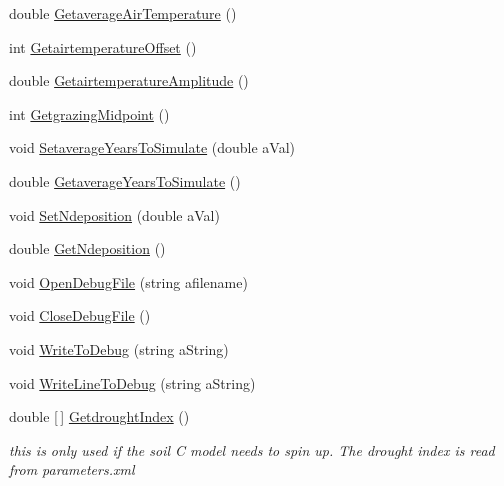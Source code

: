 \begin{DoxyCompactItemize}
\item 
double \mbox{\hyperlink{struct_global_vars_1_1zone_specific_data_a8090a944d3457c9078ef4c143591657a}{Getaverage\+Air\+Temperature}} ()
\item 
int \mbox{\hyperlink{struct_global_vars_1_1zone_specific_data_af1bd37d9f4d31ce45a6b258c17c61ee8}{Getairtemperature\+Offset}} ()
\item 
double \mbox{\hyperlink{struct_global_vars_1_1zone_specific_data_abe8d04141904b2f25c221ff6e61baa85}{Getairtemperature\+Amplitude}} ()
\item 
int \mbox{\hyperlink{struct_global_vars_1_1zone_specific_data_a7e40be9be3646dc302271d6696af70c7}{Getgrazing\+Midpoint}} ()
\item 
void \mbox{\hyperlink{struct_global_vars_1_1zone_specific_data_a9d9c7918bc0060def3f43f5225943c88}{Setaverage\+Years\+To\+Simulate}} (double a\+Val)
\item 
double \mbox{\hyperlink{struct_global_vars_1_1zone_specific_data_a07113789f9a899a461491840759674c4}{Getaverage\+Years\+To\+Simulate}} ()
\item 
void \mbox{\hyperlink{struct_global_vars_1_1zone_specific_data_aadeeac9ab87500a320f305f8e1c41c98}{Set\+Ndeposition}} (double a\+Val)
\item 
double \mbox{\hyperlink{struct_global_vars_1_1zone_specific_data_a90ad22f1144d1dc0f9bbeeacbecfae0d}{Get\+Ndeposition}} ()
\item 
void \mbox{\hyperlink{struct_global_vars_1_1zone_specific_data_a016b9b6888f6421e60fd9097379220e9}{Open\+Debug\+File}} (string afilename)
\item 
void \mbox{\hyperlink{struct_global_vars_1_1zone_specific_data_a073364a6434d45e728cfec31993dbdf2}{Close\+Debug\+File}} ()
\item 
void \mbox{\hyperlink{struct_global_vars_1_1zone_specific_data_aac8e7ce5bf98d302eafd2d4504e51323}{Write\+To\+Debug}} (string a\+String)
\item 
void \mbox{\hyperlink{struct_global_vars_1_1zone_specific_data_aab0e6941ab8bf492990a6e07386f6203}{Write\+Line\+To\+Debug}} (string a\+String)
\item 
double \mbox{[}$\,$\mbox{]} \mbox{\hyperlink{struct_global_vars_1_1zone_specific_data_a016ebda431a899b09ebdf836949f0035}{Getdrought\+Index}} ()
\begin{DoxyCompactList}\small\item\em this is only used if the soil C model needs to spin up. The drought index is read from parameters.\+xml \end{DoxyCompactList}\item 

\end{DoxyCompactItemize}
